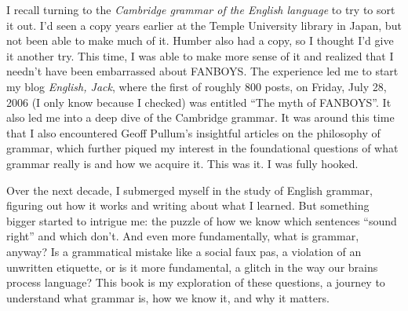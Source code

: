 I recall turning to the \textit{Cambridge grammar of the English language} to try to sort it out. I'd seen a copy years earlier at the Temple University library in Japan, but not been able to make much of it. Humber also had a copy, so I thought I'd give it another try. This time, I was able to make more sense of it and realized that I needn't have been embarrassed about FANBOYS. The experience led me to start my blog \textit{English, Jack}, where the first of roughly 800 posts, on Friday, July 28, 2006 (I only know because I checked) was entitled \enquote{The myth of FANBOYS}. It also led me into a deep dive of the Cambridge grammar. It was around this time that I also encountered Geoff Pullum's insightful articles on the philosophy of grammar, which further piqued my interest in the foundational questions of what grammar really is and how we acquire it. This was it. I was fully hooked.

Over the next decade, I submerged myself in the study of English grammar, figuring out how it works and writing about what I learned. But something bigger started to intrigue me: the puzzle of how we know which sentences \enquote{sound right} and which don't. And even more fundamentally, what is grammar, anyway? Is a grammatical mistake like a social faux pas, a violation of an unwritten etiquette, or is it more fundamental, a glitch in the way our brains process language? This book is my exploration of these questions, a journey to understand what grammar is, how we know it, and why it matters.